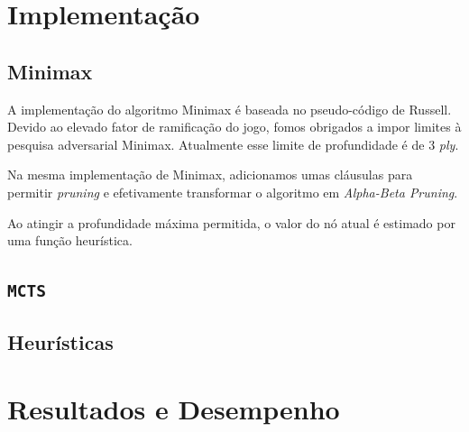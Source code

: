 \documentclass[12pt,a4paper,oneside]{article}
\begin{document}
\lipsum[1]

\lipsum[2]


\section{Implementação}
\label{sec:imp}

\lipsum[1]

\subsection{Minimax}

A implementação do algoritmo Minimax é baseada no pseudo-código de Russell\cite{Russell:AI:2003}. Devido ao elevado fator de ramificação do jogo, fomos obrigados a impor limites à pesquisa adversarial Minimax. Atualmente esse limite de profundidade é de 3 \emph{ply}.

Na mesma implementação de Minimax, adicionamos umas cláusulas para permitir \emph{pruning} e efetivamente transformar o algoritmo em \emph{Alpha-Beta Pruning}.

Ao atingir a profundidade máxima permitida, o valor do nó atual é estimado por uma função heurística.

\subsection{\texttt{MCTS}}

\lipsum[1]

\lipsum[2]

\lipsum[3]

\subsection{Heurísticas}

\lipsum[1]

\lipsum[2]

\lipsum[3]


\section{Resultados e Desempenho}
\label{sec:resdes}
\end{document}

